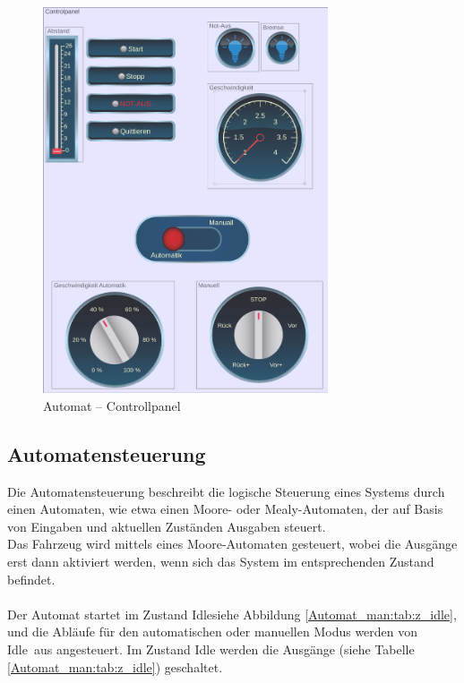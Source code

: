 \pagebreak[1]
\begin{figure}[!ht]
	\begin{center}
		\includegraphics[width=0.75\textwidth]{img/5_simulation/Automat_con.png}
		\caption{Automat – Controllpanel}
		\label{Controllpanel:img:Controllpanel}
	\end{center}
\end{figure}
\pagebreak[4]


\subsection{Automatensteuerung}
\label{Automatensteuerung}
Die Automatensteuerung beschreibt die logische Steuerung eines Systems durch einen Automaten, wie etwa einen Moore- oder Mealy-Automaten, der auf Basis von Eingaben und aktuellen Zuständen Ausgaben steuert.\\
Das Fahrzeug wird mittels eines Moore-Automaten gesteuert, wobei die Ausgänge erst dann aktiviert werden, wenn sich das System im entsprechenden Zustand befindet.\\ \ \\
Der Automat startet im Zustand \frqq Idle\flqq siehe Abbildung \ref{Automat_man:tab:z_idle}, und die Abläufe für den automatischen oder manuellen Modus werden von \frqq Idle\flqq\ aus angesteuert. Im Zustand Idle werden die Ausgänge (siehe Tabelle \ref{Automat_man:tab:z_idle}) geschaltet.\\

